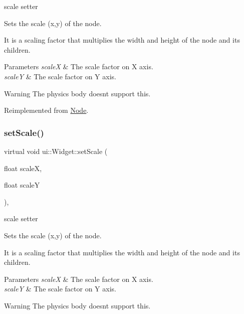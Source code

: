scale setter 

Sets the scale (x,y) of the node.

It is a scaling factor that multiplies the width and height of the node and its children.


\begin{DoxyParams}{Parameters}
{\em scaleX} & The scale factor on X axis. \\
\hline
{\em scaleY} & The scale factor on Y axis.\\
\hline
\end{DoxyParams}
\begin{DoxyWarning}{Warning}
The physics body doesn\textquotesingle{}t support this. 
\end{DoxyWarning}


Reimplemented from \hyperlink{classNode_a31f8130cfd505a5c327c4cc66fe4fa69}{Node}.

\mbox{\label{classui_1_1Widget_a2ff6617263887b25fdb0ac06ac94f31a}} 
\subsubsection{\texorpdfstring{set\+Scale()}{setScale()}\hspace{0.1cm}{\footnotesize\ttfamily [4/4]}}
{\footnotesize\ttfamily virtual void ui\+::\+Widget\+::set\+Scale (\begin{DoxyParamCaption}\item[{float}]{scaleX,  }\item[{float}]{scaleY }\end{DoxyParamCaption})\hspace{0.3cm}{\ttfamily [override]}, {\ttfamily [virtual]}}



scale setter 

Sets the scale (x,y) of the node.

It is a scaling factor that multiplies the width and height of the node and its children.


\begin{DoxyParams}{Parameters}
{\em scaleX} & The scale factor on X axis. \\
\hline
{\em scaleY} & The scale factor on Y axis.\\
\hline
\end{DoxyParams}
\begin{DoxyWarning}{Warning}
The physics body doesn\textquotesingle{}t support this. 
\end{DoxyWarning}


